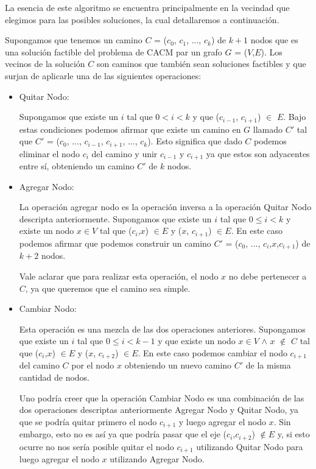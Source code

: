 La esencia de este algoritmo se encuentra principalmente en la vecindad que elegimos para las posibles soluciones, la cual detallaremos a continuación.

Supongamos que tenemos un camino $C$ = ($c_0$, $c_1$, ..., $c_k$) de $k+1$ nodos que es una solución factible del problema de CACM par un grafo $G$ = ($V$,$E$). Los vecinos de la solución $C$ son caminos que también sean soluciones factibles y que surjan de aplicarle una de las siguientes operaciones:

\begin{itemize}
 \item Quitar Nodo:

  Supongamos que existe un $i$ tal que $0 < i < k$ y que ($c_{i-1}$, $c_{i+1}$) $\in$ $E$. Bajo estas condiciones podemos afirmar que existe un camino en $G$ llamado $C'$ tal que $C'$ = ($c_0$, ..., $c_{i-1}$, $c_{i+1}$, ..., $c_k$). Esto significa que dado $C$ podemos eliminar el nodo $c_i$ del camino y unir $c_{i-1}$ y $c_{i+1}$ ya que estos son adyacentes entre sí, obteniendo un camino $C'$ de $k$ nodos.
  \item Agregar Nodo:

  La operación agregar nodo es la operación inversa a la operación Quitar Nodo descripta anteriormente. Supongamos que existe un $i$ tal que $0 \leq i < k$ y existe un nodo $x \in V$ tal que ($c_i$,$x$) $\in E$ y ($x$, $c_{i+1}$) $\in E$. En este caso podemos afirmar que podemos construir un camino $C'$ = ($c_0$, ..., $c_{i}$,$x$,$c_{i+1}$) de $k+2$ nodos.

  Vale aclarar que para realizar esta operación, el nodo $x$ no debe pertenecer a $C$, ya que queremos que el camino sea simple.

  \item Cambiar Nodo:

  Esta operación es una mezcla de las dos operaciones anteriores. Supongamos que existe un $i$ tal que $0 \leq i < k-1$ y que existe un nodo $x \in V$ $\wedge$ $x$ $\notin$ $C$ tal que ($c_i$,$x$) $\in E$ y ($x$, $c_{i+2}$) $\in E$. En este caso podemos cambiar el nodo $c_{i+1}$ del camino $C$ por el nodo $x$ obteniendo un nuevo camino $C'$ de la misma cantidad de nodos.

  Uno podría creer que la operación Cambiar Nodo es una combinación de las dos operaciones descriptas anteriormente Agregar Nodo y Quitar Nodo, ya que se podría quitar primero el nodo $c_{i+1}$ y luego agregar el nodo $x$. Sin embargo, esto no es así ya que podría pasar que el eje ($c_i$,$c_{i+2}$) $\notin E$ y, si esto ocurre no nos sería posible quitar el nodo $c_{i+1}$ utilizando Quitar Nodo para luego agregar el nodo $x$ utilizando Agregar Nodo.

\end{itemize}
 
